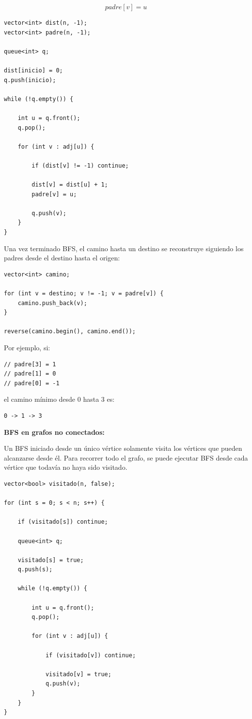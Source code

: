 \documentclass[10pt,a4paper,twocolumn]{article}
\begin{document}
\[
padre[v] = u
\]

\begin{lstlisting}[style=cpp]
vector<int> dist(n, -1);
vector<int> padre(n, -1);

queue<int> q;

dist[inicio] = 0;
q.push(inicio);

while (!q.empty()) {

    int u = q.front();
    q.pop();

    for (int v : adj[u]) {

        if (dist[v] != -1) continue;

        dist[v] = dist[u] + 1;
        padre[v] = u;

        q.push(v);
    }
}
\end{lstlisting}

Una vez terminado BFS, el camino hasta un destino se reconstruye
siguiendo los padres desde el destino hasta el origen:

\begin{lstlisting}[style=cpp]
vector<int> camino;

for (int v = destino; v != -1; v = padre[v]) {
    camino.push_back(v);
}

reverse(camino.begin(), camino.end());
\end{lstlisting}

Por ejemplo, si:

\begin{lstlisting}[style=cpp]
// padre[3] = 1
// padre[1] = 0
// padre[0] = -1
\end{lstlisting}

el camino mínimo desde $0$ hasta $3$ es:

\begin{lstlisting}[style=cpp]
0 -> 1 -> 3
\end{lstlisting}

\textbf{BFS en grafos no conectados:}

Un BFS iniciado desde un único vértice solamente visita los vértices
que pueden alcanzarse desde él. Para recorrer todo el grafo, se puede
ejecutar BFS desde cada vértice que todavía no haya sido visitado.

\begin{lstlisting}[style=cpp]
vector<bool> visitado(n, false);

for (int s = 0; s < n; s++) {

    if (visitado[s]) continue;

    queue<int> q;

    visitado[s] = true;
    q.push(s);

    while (!q.empty()) {

        int u = q.front();
        q.pop();

        for (int v : adj[u]) {

            if (visitado[v]) continue;

            visitado[v] = true;
            q.push(v);
        }
    }
}
\end{lstlisting}
\end{document}
